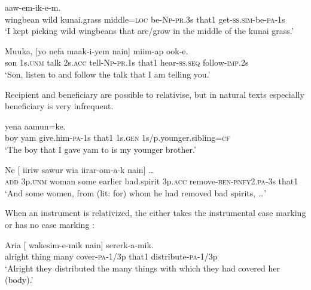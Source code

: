 \ea%
\label{ex:8:x1537}
\gll [\textstyleEmphasizedVernacularWords{Mesa}  \textstyleEmphasizedVernacularWords{asia}  fiker(a)  gone=pa  ika-i-ya  nain] aaw-em-ik-e-m.\\
wingbean  wild  kunai.grass  middle=\textsc{loc} be-\textsc{Np}-\textsc{pr}.3s that1 get-\textsc{ss}.\textsc{sim}-be-\textsc{pa}-1s\\
\glt`I kept picking wild wingbeans that are/grow in the middle of the kunai grass.'
\z


\ea%
\label{ex:8:x1538}
\gll Muuka,  [yo    nefa  maak-i-yem  nain]  miim-ap ook-e.\\
son  1s.\textsc{unm} talk 2s.\textsc{acc} tell-\textsc{Np}-\textsc{pr}.1s that1 hear-\textsc{ss}.\textsc{seq} follow-\textsc{imp}.2s\\
\glt`Son, listen to and follow the talk that I am telling you.'
\z


Recipient  and beneficiary  are possible to relativise, but in natural texts especially beneficiary is very infrequent.

\ea%
\label{ex:8:x1539}
  yena  aamun=ke.\\
boy  yam  give.him-\textsc{pa}-1s that1 1s.\textsc{gen} 1s/p.younger.sibling=\textsc{cf}\\
\glt`The boy that I gave yam to is my younger brother.'
\z


\ea%
\label{ex:8:x1547}
\gll Ne  [      iiriw  sawur  wia iirar-om-a-k  nain]  {\dots}\\
\textsc{add} 3p.\textsc{unm} woman  some  earlier  bad.spirit 3p.\textsc{acc} remove-\textsc{ben}-\textsc{bnfy}2.\textsc{pa}-3s  that1\\
\glt`And some women, from (lit: for) whom he had removed bad spirits, {\dots}'
\z


When an instrument is relativized, the  either takes the instrumental case marking  or has no case marking : 

\ea%
\label{ex:8:x1553}
\gll Aria  [   wakesim-e-mik  nain]  sererk-a-mik.\\
alright  thing  many  cover-\textsc{pa}-1/3p  that1  distribute-\textsc{pa}-1/3p\\
\glt`Alright they distributed the many things with which they had covered her (body).'
\z


